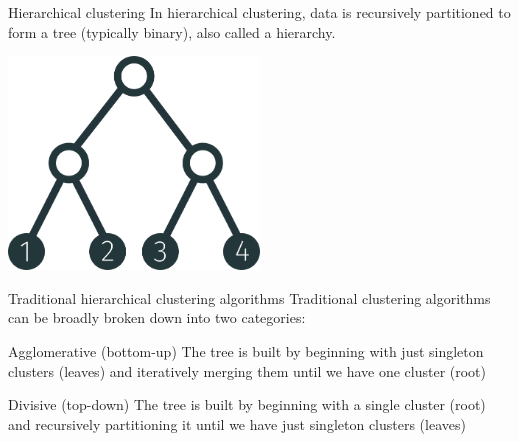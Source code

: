 \documentclass[10pt, compress]{beamer}
\begin{document}
\begin{frame}{Hierarchical clustering}
  In \alert{hierarchical clustering}, data
  is recursively partitioned to form a tree (typically binary),
  also called a hierarchy.

  \begin{center}
    \includegraphics[width=0.5\textwidth]{img/tree-1234-balanced}
  \end{center}


\end{frame}

\begin{frame}{Traditional hierarchical clustering algorithms}
  Traditional clustering algorithms can be broadly broken
  down into two categories:

  \pause
  \begin{block}{Agglomerative (bottom-up)}
    The tree is built by
      beginning with just singleton clusters (leaves) and
      iteratively merging them until we have one cluster (root)
    \end{block}
  \pause
  \begin{block}{Divisive (top-down)}
    The tree is built
      by beginning with a single cluster (root) and
      recursively partitioning it until we
      have just singleton clusters (leaves)
  \end{block}
\end{frame}

\end{document}
